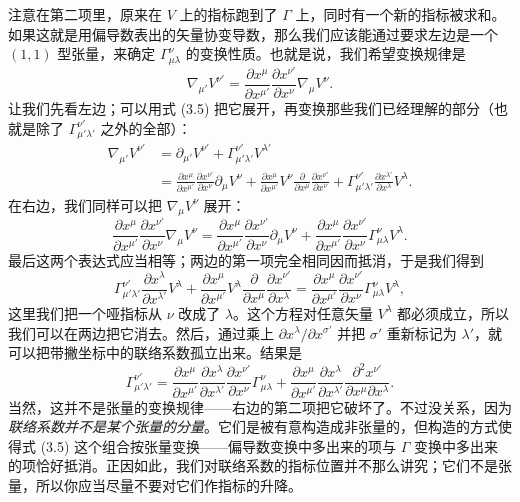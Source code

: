 注意在第二项里，原来在 $V$ 上的指标跑到了 $\Gamma$ 上，同时有一个新的指标被求和。如果这就是用偏导数表出的矢量协变导数，那么我们应该能通过要求左边是一个 $(1,1)$ 型张量，来确定 $\Gamma^\nu_{\mu\lambda}$ 的变换性质。也就是说，我们希望变换规律是
\begin{equation*}
\nabla_{\mu'} V^{\nu'} = \frac{\partial x^\mu}{\partial x^{\mu'}}\frac{\partial x^{\nu'}}{\partial x^\nu}\nabla_\mu V^\nu.
\tag{3.6}
\end{equation*}
让我们先看左边；可以用式 (3.5) 把它展开，再变换那些我们已经理解的部分（也就是除了 $\Gamma^{\nu'}_{\mu'\lambda'}$ 之外的全部）：
\begin{align*}
\nabla_{\mu'} V^{\nu'} &= \partial_{\mu'} V^{\nu'} + \Gamma^{\nu'}_{\mu'\lambda'} V^{\lambda'}\\
&= \frac{\partial x^\mu}{\partial x^{\mu'}}\frac{\partial x^{\nu'}}{\partial x^\nu}\partial_\mu V^\nu + \frac{\partial x^\mu}{\partial x^{\mu'}}V^\nu\frac{\partial}{\partial x^\mu}\frac{\partial x^{\nu'}}{\partial x^\nu} + \Gamma^{\nu'}_{\mu'\lambda'}\frac{\partial x^{\lambda'}}{\partial x^\lambda}V^\lambda.
\tag{3.7}
\end{align*}
在右边，我们同样可以把 $\nabla_\mu V^\nu$ 展开：
\begin{equation*}
\frac{\partial x^\mu}{\partial x^{\mu'}}\frac{\partial x^{\nu'}}{\partial x^\nu}\nabla_\mu V^\nu = \frac{\partial x^\mu}{\partial x^{\mu'}}\frac{\partial x^{\nu'}}{\partial x^\nu}\partial_\mu V^\nu + \frac{\partial x^\mu}{\partial x^{\mu'}}\frac{\partial x^{\nu'}}{\partial x^\nu}\Gamma^\nu_{\mu\lambda}V^\lambda.
\tag{3.8}
\end{equation*}
最后这两个表达式应当相等；两边的第一项完全相同因而抵消，于是我们得到
\begin{equation*}
\Gamma^{\nu'}_{\mu'\lambda'}\frac{\partial x^\lambda}{\partial x^{\lambda'}}V^\lambda + \frac{\partial x^\mu}{\partial x^{\mu'}}V^\lambda\frac{\partial}{\partial x^\mu}\frac{\partial x^{\nu'}}{\partial x^\lambda} = \frac{\partial x^\mu}{\partial x^{\mu'}}\frac{\partial x^{\nu'}}{\partial x^\nu}\Gamma^\nu_{\mu\lambda}V^\lambda,
\tag{3.9}
\end{equation*}
这里我们把一个哑指标从 $\nu$ 改成了 $\lambda$。这个方程对任意矢量 $V^\lambda$ 都必须成立，所以我们可以在两边把它消去。然后，通过乘上 $\partial x^\lambda/\partial x^{\sigma'}$ 并把 $\sigma'$ 重新标记为 $\lambda'$，就可以把带撇坐标中的联络系数孤立出来。结果是
\begin{equation*}
\Gamma^{\nu'}_{\mu'\lambda'} = \frac{\partial x^\mu}{\partial x^{\mu'}}\frac{\partial x^\lambda}{\partial x^{\lambda'}}\frac{\partial x^{\nu'}}{\partial x^\nu}\Gamma^\nu_{\mu\lambda} + \frac{\partial x^\mu}{\partial x^{\mu'}}\frac{\partial x^\lambda}{\partial x^{\lambda'}}\frac{\partial^2 x^{\nu'}}{\partial x^\mu\partial x^\lambda}.
\tag{3.10}
\end{equation*}
当然，这并不是张量的变换规律——右边的第二项把它破坏了。不过没关系，因为\emph{联络系数并不是某个张量的分量}。它们是被有意构造成非张量的，但构造的方式使得式 (3.5) 这个组合按张量变换——偏导数变换中多出来的项与 $\Gamma$ 变换中多出来的项恰好抵消。正因如此，我们对联络系数的指标位置并不那么讲究；它们不是张量，所以你应当尽量不要对它们作指标的升降。

